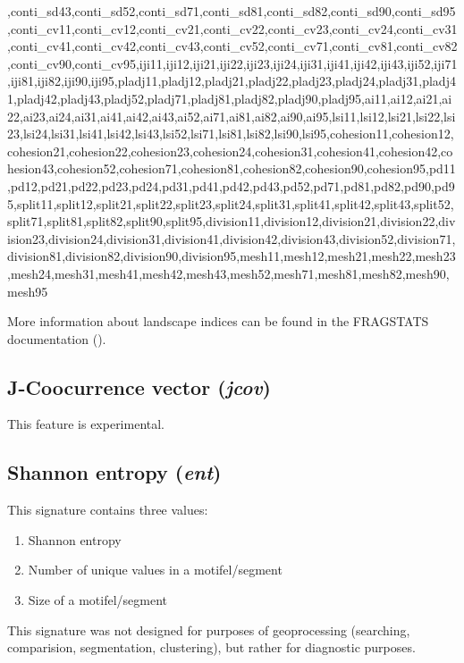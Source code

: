 ,conti_sd43,conti_sd52,conti_sd71,conti_sd81,conti_sd82,conti_sd90,conti_sd95,conti_cv11,conti_cv12,conti_cv21,conti_cv22,conti_cv23,conti_cv24,conti_cv31,conti_cv41,conti_cv42,conti_cv43,conti_cv52,conti_cv71,conti_cv81,conti_cv82,conti_cv90,conti_cv95,iji11,iji12,iji21,iji22,iji23,iji24,iji31,iji41,iji42,iji43,iji52,iji71,iji81,iji82,iji90,iji95,pladj11,pladj12,pladj21,pladj22,pladj23,pladj24,pladj31,pladj41,pladj42,pladj43,pladj52,pladj71,pladj81,pladj82,pladj90,pladj95,ai11,ai12,ai21,ai22,ai23,ai24,ai31,ai41,ai42,ai43,ai52,ai71,ai81,ai82,ai90,ai95,lsi11,lsi12,lsi21,lsi22,lsi23,lsi24,lsi31,lsi41,lsi42,lsi43,lsi52,lsi71,lsi81,lsi82,lsi90,lsi95,cohesion11,cohesion12,cohesion21,cohesion22,cohesion23,cohesion24,cohesion31,cohesion41,cohesion42,cohesion43,cohesion52,cohesion71,cohesion81,cohesion82,cohesion90,cohesion95,pd11,pd12,pd21,pd22,pd23,pd24,pd31,pd41,pd42,pd43,pd52,pd71,pd81,pd82,pd90,pd95,split11,split12,split21,split22,split23,split24,split31,split41,split42,split43,split52,split71,split81,split82,split90,split95,division11,division12,division21,division22,division23,division24,division31,division41,division42,division43,division52,division71,division81,division82,division90,division95,mesh11,mesh12,mesh21,mesh22,mesh23,mesh24,mesh31,mesh41,mesh42,mesh43,mesh52,mesh71,mesh81,mesh82,mesh90,mesh95



More information about landscape indices can be found in the FRAGSTATS documentation (\cite{mcgarigal2014fragstats}).

\subsection{J-Coocurrence vector ({\it jcov})}

This feature is experimental.

\subsection{Shannon entropy ({\it ent})}

This signature contains three values:

\begin{enumerate}
  \item Shannon entropy
  \item Number of unique values in a motifel/segment
  \item Size of a motifel/segment
\end{enumerate}

This signature was not designed for purposes of geoprocessing (searching, comparision, segmentation, clustering), but rather for diagnostic purposes.